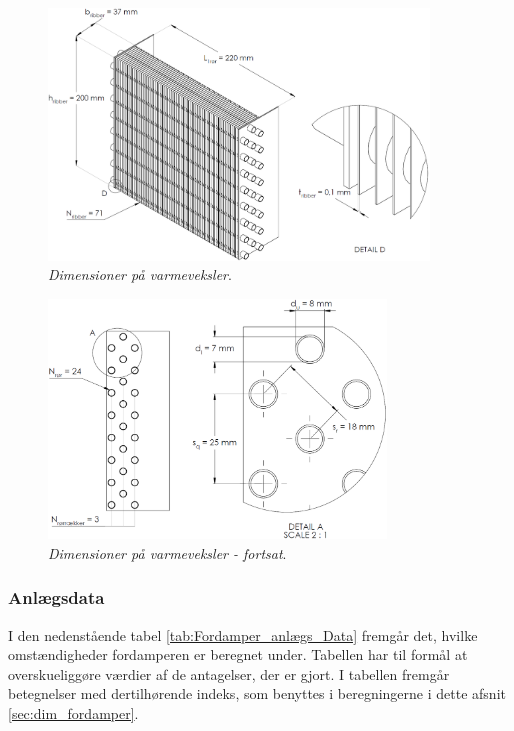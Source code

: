 \documentclass[../Hovedrapport.tex]{subfiles}
\begin{document}
\begin{figure}[H]
    \centering    \includegraphics[width=0.9\textwidth]{Billeder/varmevekslerdim1.png}
    \caption{\textit{Dimensioner på varmeveksler}.}
    \label{fig:varmevekslerdim1}
\end{figure}
\begin{figure}[H]
    \centering
    \includegraphics[width=0.8\textwidth]{Billeder/varmevekslerdim2.png}
    \caption{\textit{Dimensioner på varmeveksler - fortsat}.}
    \label{fig:varmevekslerdim2}
\end{figure}


\subsubsection*{Anlægsdata}
I den nedenstående tabel \ref{tab:Fordamper_anlægs_Data} fremgår det, hvilke omstændigheder fordamperen er beregnet under. Tabellen har til formål at overskueliggøre værdier af de antagelser, der er gjort. I tabellen fremgår betegnelser med dertilhørende indeks, som benyttes i beregningerne i dette afsnit \ref{sec:dim_fordamper}.
\end{document}
